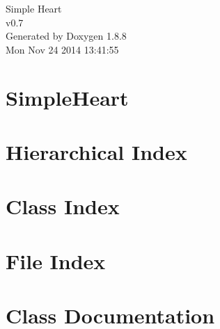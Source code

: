 \documentclass[twoside]{book}
\newcommand{\+}{\discretionary{\mbox{\scriptsize$\hookleftarrow$}}{}{}}
\newcommand{\clearemptydoublepage}{%
  \newpage{\pagestyle{empty}\cleardoublepage}%
}
\begin{document}
\hypersetup{pageanchor=false,
             bookmarks=true,
             bookmarksnumbered=true,
             pdfencoding=unicode
            }
\begin{titlepage}
\vspace*{7cm}
\begin{center}%
{\Large Simple Heart \\[1ex]\large v0.\+7 }\\
\vspace*{1cm}
{\large Generated by Doxygen 1.8.8}\\
\vspace*{0.5cm}
{\small Mon Nov 24 2014 13:41:55}\\
\end{center}
\end{titlepage}
\clearemptydoublepage
\tableofcontents
\clearemptydoublepage
{}
\hypersetup{pageanchor=true}

\chapter{Simple\+Heart}
\label{md__r_e_a_d_m_e}
\hypertarget{md__r_e_a_d_m_e}{}

\chapter{Hierarchical Index}

\chapter{Class Index}

\chapter{File Index}

\chapter{Class Documentation}









































\end{document}
